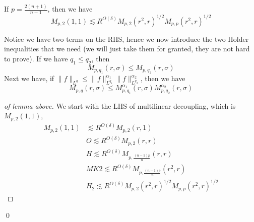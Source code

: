\begin{lemma}
    If $p=\frac{2(n+1)}{n-1}$, then we have
    \begin{equation*}
        M_{p,2}(1,1)\lesssim R^{O(\delta)}M_{p,2}(r^2,r)^{1/2}M_{p,p}(r^2,r)^{1/2}
    \end{equation*}
\end{lemma}
Notice we have two terms on the RHS, hence we now introduce the two Holder inequalities that we need (we will just take them for granted, they are not hard to prove).
If we have $q_1\leq q_2$, then
\begin{equation*}
    M_{p,q_1}(r,\sigma)\leq M_{p,q_2}(r,\sigma)
\end{equation*}
Next we have, if $\|f\|_{L^q}\leq\|f\|_{L^{q_1}}^{\alpha_1}\|f\|_{L^{q_2}}^{\alpha_2}$, then we have
\begin{equation*}
    M_{p,q}(r,\sigma)\leq M_{p,q_1}^{\alpha_1}(r, \sigma)M_{p,q_2}^{\alpha_2}(r,\sigma)
\end{equation*}
\begin{proof}[of lemma above]
    We start with the LHS of multilinear decoupling, which is $M_{p,2}(1,1)$,
    \begin{align*}
        M_{p,2}(1,1)&\lesssim R^{O(\delta)}M_{p,2}(r,1)\\
        & O \lesssim R^{O(\delta)}M_{p,2}(r,r)\\
        & H \lesssim R^{O(\delta)}M_{p,\frac{(n-1)p}{n}}(r,r)\\
        & MK2 \lesssim R^{O(\delta)}M_{p,\frac{(n-1)p}{n}}(r^2,r)\\
        & H_2 \lesssim R^{O(\delta)} M_{p,2}(r^2,r)^{1/2}M_{p,p}(r^2,r)^{1/2}
    \end{align*}
\end{proof}
\qed

